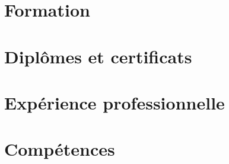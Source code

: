 




\begin{sloppypar}
\begin{paracol}{2}

\begin{absolutelynopagebreak}



\section{Formation}




\section{Dipl\^omes et certificats}




\section{Exp\'erience professionnelle}




\section{Comp\'etences}


\end{absolutelynopagebreak}

\switchcolumn

\begin{absolutelynopagebreak}



\end{absolutelynopagebreak}
\end{paracol}
\end{sloppypar}
